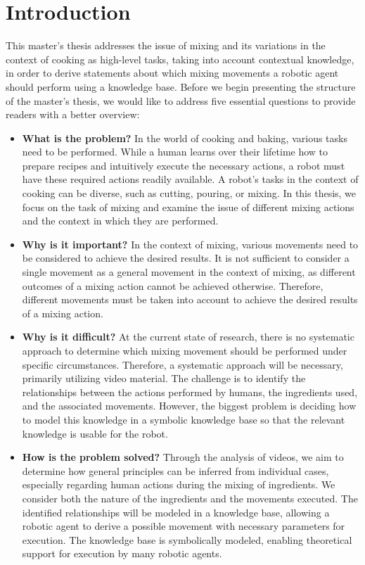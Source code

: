\chapter{Introduction}
This master's thesis addresses the issue of mixing and its variations in the context of cooking as high-level tasks, taking into account contextual knowledge, in order to derive statements about which mixing movements a robotic agent should perform using a knowledge base.
Before we begin presenting the structure of the master's thesis, we would like to address five essential questions to provide readers with a better overview:
\begin{itemize}
    \item \textbf{What is the problem?} In the world of cooking and baking, various tasks need to be performed. While a human learns over their lifetime how to prepare recipes and intuitively execute the necessary actions, a robot must have these required actions readily available. A robot's tasks in the context of cooking can be diverse, such as cutting, pouring, or mixing. In this thesis, we focus on the task of mixing and examine the issue of different mixing actions and the context in which they are performed.    
    \item \textbf{Why is it important?} In the context of mixing, various movements need to be considered to achieve the desired results. It is not sufficient to consider a single movement as a general movement in the context of mixing, as different outcomes of a mixing action cannot be achieved otherwise. Therefore, different movements must be taken into account to achieve the desired results of a mixing action.
    \item \textbf{Why is it difficult?} At the current state of research, there is no systematic approach to determine which mixing movement should be performed under specific circumstances. Therefore, a systematic approach will be necessary, primarily utilizing video material. The challenge is to identify the relationships between the actions performed by humans, the ingredients used, and the associated movements. However, the biggest problem is deciding how to model this knowledge in a symbolic knowledge base so that the relevant knowledge is usable for the robot.
    \item \textbf{How is the problem solved?} Through the analysis of videos, we aim to determine how general principles can be inferred from individual cases, especially regarding human actions during the mixing of ingredients. We consider both the nature of the ingredients and the movements executed. The identified relationships will be modeled in a knowledge base, allowing a robotic agent to derive a possible movement with necessary parameters for execution. The knowledge base is symbolically modeled, enabling theoretical support for execution by many robotic agents.

\end{itemize}
